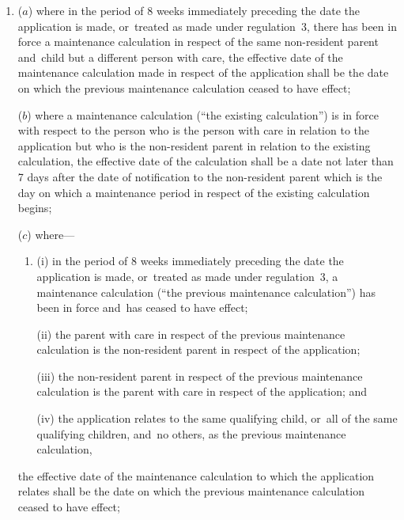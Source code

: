 \documentclass[12pt,a4paper]{article}
\begin{document}
\begin{enumerate}\item[]
($a$) 
where in the period of 8 weeks immediately preceding the date the application is made, or~treated as made under regulation~3, there has been in force a maintenance calculation in respect of the same non-resident parent and~child but a different person with care, the effective date of the maintenance calculation made in respect of the application shall be %
the date  %
on which the previous maintenance calculation ceased to have effect;

($b$) where a maintenance calculation (“the existing calculation”) is in force with respect to the person who is the person with care in relation to the application but who is the non-resident parent in relation to the existing calculation, the effective date of the calculation shall be a date not later than 7 days after the date of notification to the non-resident parent which is the day on which a maintenance period in respect of the existing calculation begins;

($c$) 
 where—
\begin{enumerate}\item[]
(i) in the period of 8 weeks immediately preceding the date the application is made, or~treated as made under regulation~3, a maintenance calculation (“the previous maintenance calculation”) has been in force and~has ceased to have effect;

(ii) the parent with care in respect of the previous maintenance calculation is the non-resident parent in respect of the application;

(iii) the non-resident parent in respect of the previous maintenance calculation is the parent with care in respect of the application; and

(iv) the application relates to the same qualifying child, or~all of the same qualifying children, and~no others, as the previous maintenance calculation,
\end{enumerate}
the effective date of the maintenance calculation to which the application relates shall be the date on which the previous maintenance calculation ceased to have effect;


\end{enumerate}
\end{document}
